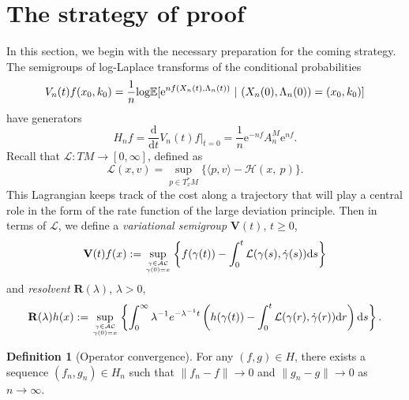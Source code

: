 \documentclass[a4paper]{article}
\numberwithin{equation}{section}
\theoremstyle{definition}
\newtheorem{definition}[theorem]{Definition}
\begin{document}
\section{The strategy of proof }\label{sec:The_strategy}
In this section, we begin with the necessary preparation for the coming strategy.
The semigroups of log-Laplace transforms of the conditional probabilities
\begin{equation}\label{eqn_Vsemigroup}
V_n(t)f(x_0,k_0)=\frac{1}{n}\text{\rm{log}}\mathbb{E}[\mathrm{e}^{nf(X_n (t),\Lambda_n(t))}~|~(X_n(0),\Lambda_n(0))=(x_0,k_0)]
\end{equation}
have generators 
\begin{equation}\label{eqn_HVN}
    H_nf=\frac{\mathrm{d}}{\mathrm{d}t}V_n(t)f \Big|_{t=0} =\frac{1}{n}\mathrm{e}^{-nf}A^M_n\mathrm{e}^{nf}.
\end{equation}
Recall that $\mathcal{L}: TM \to  [0, \infty]$, defined as 
\begin{equation*}
	\mathcal{L}(x, v) = \sup_{p\in T^*_xM}\{\langle p, v\rangle-\mathcal{H}(x,~p)\}.   
\end{equation*}
This Lagrangian keeps track of the cost along a trajectory that will play a central role in the form of the rate function of the large deviation principle. 
Then in terms of $\mathcal{L}$, we define a \textit{variational semigroup} $\mathbf{V}(t)$, $t \geq 0$,
\begin{equation*}
	\mathbf{V}(t)f(x):=\sup_{\gamma \in\mathcal{AC}\atop \gamma(0)=x}\left\{f(\gamma(t))-\int^t_0\mathcal{L}(\gamma(s),\dot{\gamma}(s))\mathrm{d}s\right\}
\end{equation*}
and \textit{resolvent} $\mathbf{R}(\lambda)$, $\lambda> 0$,  
\begin{equation}\label{eqn_bfR}
\begin{split}
	\mathbf{R}(\lambda)h(x):=\sup_{\gamma\in \mathcal{AC}\atop \gamma(0)=x}\left\{\int^\infty_0 \lambda^{-1}e^{-\lambda^{-1}t}\left(h(\gamma(t))-\int^t_0\mathcal{L}(\gamma(r),\dot{\gamma} (r))\mathrm{d}r\right)\mathrm{d}s\right\}.
 \end{split}
\end{equation}

\begin{definition}[Operator convergence]
For any $(f,g)\in H$, there exists a sequence $(f_n,g_n)\in H_n$ such that $\|f_n-f\|\to 0$ and $\|g_n-g\|\to 0$ as $n\to \infty$.
\end{definition} 
\end{document}

